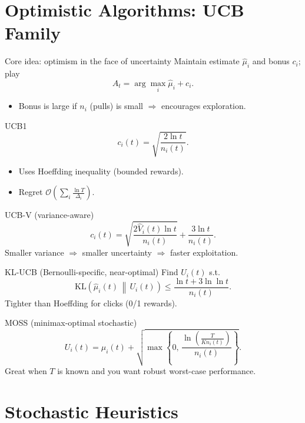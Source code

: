 \documentclass[aspectratio=169]{beamer}
\newcommand{\KL}{\mathrm{KL}}
\newcommand{\cO}{\mathcal{O}}
\begin{document}
\section{Optimistic Algorithms: UCB Family}

\begin{frame}{Core idea: optimism in the face of uncertainty}
\small
Maintain estimate $\hat{\mu}_i$ and bonus $c_i$; play
\[
A_t = \arg\max_i \hat{\mu}_i + c_i.
\]
\begin{itemize}
  \item Bonus is large if $n_i$ (pulls) is small $\Rightarrow$ encourages exploration.
\end{itemize}
\end{frame}

\begin{frame}{UCB1}
\small
\[
c_i(t)=\sqrt{\frac{2\ln t}{n_i(t)}}.
\]
\begin{itemize}
  \item Uses Hoeffding inequality (bounded rewards).
  \item Regret $\cO\!\left(\sum_i \frac{\ln T}{\Delta_i}\right)$.
\end{itemize}
\end{frame}

\begin{frame}{UCB-V (variance-aware)}
\small
\[
c_i(t)=\sqrt{\frac{2\hat{V}_i(t)\ln t}{n_i(t)}}+\frac{3\ln t}{n_i(t)}.
\]
Smaller variance $\Rightarrow$ smaller uncertainty $\Rightarrow$ faster exploitation.
\end{frame}

\begin{frame}{KL-UCB (Bernoulli-specific, near-optimal)}
\small
Find $U_i(t)$ s.t.
\[
\KL\!\left(\hat{\mu}_i(t)\,\middle\|\,U_i(t)\right)\le \frac{\ln t + 3\ln\ln t}{n_i(t)}.
\]
Tighter than Hoeffding for clicks (0/1 rewards).
\end{frame}

\begin{frame}{MOSS (minimax-optimal stochastic)}
\small
\[
U_i(t)=\hat{\mu}_i(t) + \sqrt{\max\!\left\{0,\,\frac{\ln\!\left(\frac{T}{K n_i(t)}\right)}{n_i(t)}\right\}}.
\]
Great when $T$ is known and you want robust worst-case performance.
\end{frame}

\section{Stochastic Heuristics}
\end{document}
